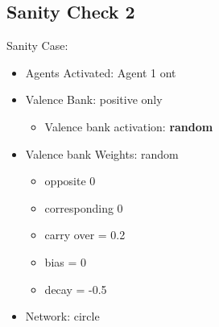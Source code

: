 \documentclass{article}\usepackage[]{graphicx}\usepackage[]{color}
\begin{document}
\subsection{Sanity Check 2}
\label{sec:sanity2}
Sanity Case:
\begin{itemize}
  \item Agents Activated: Agent 1 ont
  \item Valence Bank: positive only
  \begin{itemize}
      \item Valence bank activation: \textbf{random}
  \end{itemize}
  \item Valence bank Weights: random
  \begin{itemize}
      \item opposite 0
      \item corresponding 0
      \item carry over = 0.2
      \item bias = 0
      \item decay = -0.5
  \end{itemize}
  \item Network: circle
\end{itemize}
\end{document}
